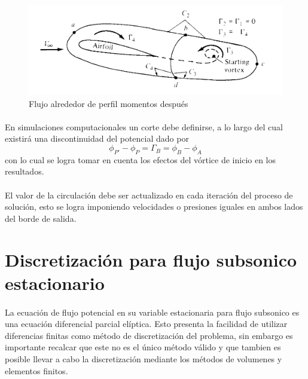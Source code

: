 \documentclass[letterpaper, openright, 12pt]{book}
\begin{document}
        \begin{figure}[htbp!]
            \centering
            \includegraphics[keepaspectratio, width=115mm]{./Imagenes/circulacion_tiempo}
            \caption[Flujo alrededor de perfil momentos después]{Flujo alrededor
                de perfil momentos después\cite{anderson_fundamentals}}
            \label{circulacion_tiempo}
        \end{figure}

    \paragraph*{}
        En simulaciones computacionales un corte debe definirse, a lo largo del cual existirá
        una discontinuidad del potencial dado por
        \begin{equation}
            \phi_{P'} - \phi_{P} = \Gamma_{B} = \phi_{B} - \phi_{A}
        \end{equation}
        con lo cual se logra tomar en cuenta los efectos del vórtice de inicio
        en los resultados.

    \paragraph*{}
        El valor de la circulación debe ser actualizado en cada iteración del
        proceso de solución, esto se logra imponiendo velocidades o presiones
        iguales en ambos lados del borde de salida.

    \section{Discretización para flujo subsonico estacionario}
    \paragraph*{}
        La ecuación de flujo potencial en su variable estacionaria para flujo
        subsonico es una ecuación diferencial parcial elíptica. Esto presenta la
        facilidad de utilizar diferencias finitas como método de discretización
        del problema, sin embargo es importante recalcar que este no es el
        único método válido y que tambien es posible llevar a cabo la
        discretización mediante los métodos de volumenes y elementos finitos.
\end{document}
